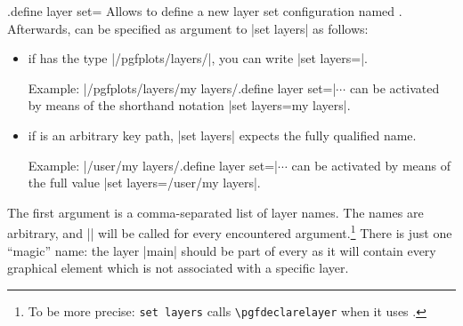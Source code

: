 \begin{handler}{{.define layer set}=}
    Allows to define a new layer set configuration named .
    Afterwards,  can be specified as argument to |set layers| as
    follows:
    \begin{itemize}
        \item if  has the type |/pgfplots/layers/|, you
            can write |set layers=|.

            Example: |/pgfplots/layers/my layers/.define layer set=|$\cdots$
            can be activated by means of the shorthand notation
            |set layers=my layers|.
        \item if  is an arbitrary key path, |set layers| expects
            the fully qualified  name.

            Example: |/user/my layers/.define layer set=|$\cdots$ can be
            activated by means of the full value
            |set layers=/user/my layers|.
    \end{itemize}

    The first argument  is a comma-separated list of
    layer names. The names are arbitrary, and |\pgfdeclarelayer| will be called
    for every encountered argument.\footnote{To be more precise: \texttt{set
    layers} calls \texttt{\textbackslash pgfdeclarelayer} when it uses
    .} There is just one ``magic'' name: the layer
    |main| should be part of every  as it will
    contain every graphical element which is not associated with a specific
    layer.


\end{handler}
